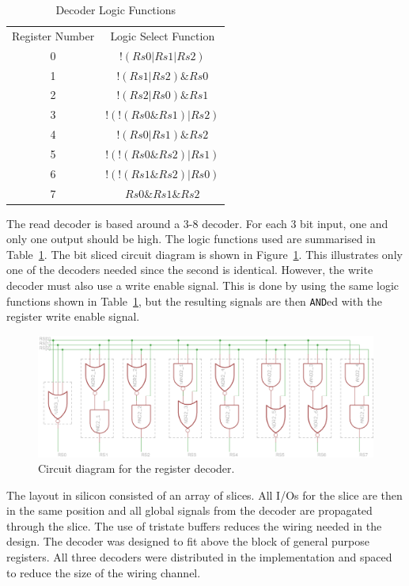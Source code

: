 \begin{table}
\caption{Decoder Logic Functions}
\label{tab:reg:decoder}
\centering
\begin{tabular}{cc}
Register Number & Logic Select Function \\
0		&		$!( Rs0 | Rs1 | Rs2 )$ \\
1		&		$ !( Rs1 | Rs2 ) \& Rs0$	\\
2		&		$!( Rs2 | Rs0 ) \& Rs1$\\
3		&		$! ( ! ( Rs0 \& Rs1 ) | Rs2 )$	\\
4		&		$!( Rs0 | Rs1 ) \& Rs2$	\\
5		&		$! ( ! ( Rs0 \& Rs2 ) | Rs1 )$	\\
6		&		$! ( ! ( Rs1 \& Rs2 ) | Rs0 )$	\\
7		&		$Rs0 \& Rs1 \& Rs2$	\\
\end{tabular}

\end{table}

The read decoder is based around a 3-8 decoder. 
For each 3 bit input, one and only one output should be high. 
The logic functions used are summarised in Table~\ref{tab:reg:decoder}.
The bit sliced circuit diagram is shown in Figure~\ref{fig:reg:decoder}.
This illustrates only one of the decoders needed since the second is identical.
However, the write decoder must also use a write enable signal.
This is done by using the same logic functions shown in Table~\ref{tab:reg:decoder}, but the resulting signals are then \texttt{AND}ed with the register write enable signal. 

\begin{figure}
\centering
\includegraphics[width=\textwidth]{../../eagle/regBlock/regBlock_decoder.png}
\caption{Circuit diagram for the register decoder.}
\label{fig:reg:decoder}
\end{figure}

The layout in silicon consisted of an array of slices. 
All I/Os for the slice are then in the same position and all global signals from the decoder are propagated through the slice.
The use of tristate buffers reduces the wiring needed in the design. 
The decoder was designed to fit above the block of general purpose registers. 
All three decoders were distributed in the implementation and spaced to reduce the size of the wiring channel.
